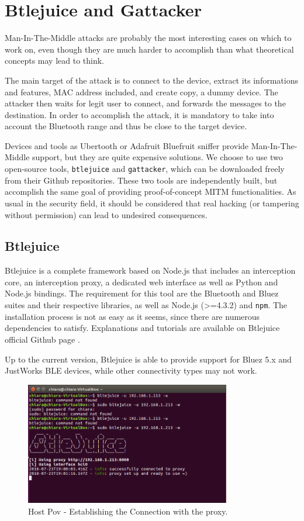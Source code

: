 \chapter{Btlejuice and Gattacker}
\label{chapter5}
\thispagestyle{empty}

\noindent 
Man-In-The-Middle attacks are probably the most interesting cases on which to work on, even though they are much harder to accomplish than what theoretical concepts may lead to think.

The main target of the attack is to connect to the device, extract its informations and features, MAC address included, and create copy, a dummy device. The attacker then waits for legit user to connect, and forwards the messages to the destination. In order to accomplish the attack, it is mandatory to take into account the Bluetooth range and thus be close to the target device.

Devices and tools as Ubertooth or Adafruit Bluefruit sniffer provide Man-In-The-Middle support, but they are quite expensive solutions. We choose to use two open-source tools, \texttt{btlejuice} and \texttt{gattacker}, which can be downloaded freely from their Github repositories. These two tools are independently built, but accomplish the same goal of providing proof-of-concept MITM functionalities. As usual in the security field, it should be considered that real hacking (or tampering without permission) can lead to undesired consequences.

\section{Btlejuice}
Btlejuice is a complete framework based on Node.js that includes an interception core, an interception proxy, a dedicated web interface as well as Python and Node.js bindings.
The requirement for this tool are the Bluetooth and Bluez suites and their respective libraries, as well as Node.js (>=4.3.2) and \texttt{npm}. The installation process is not as easy as it seems, since there are numerous dependencies to satisfy. Explanations and tutorials are available on Btlejuice official Github page \cite{btlejuice-repo}.

Up to the current version, Btlejuice is able to provide support for Bluez 5.x and JustWorks BLE devices, while other connectivity types may not work.

\begin{figure}
	\centering
	\includegraphics[width=0.8\textwidth]{host1.png}
	\caption{Host Pov - Establishing the Connection with the proxy.}
	\label{fig:btlejuice-host1}
\end{figure}

